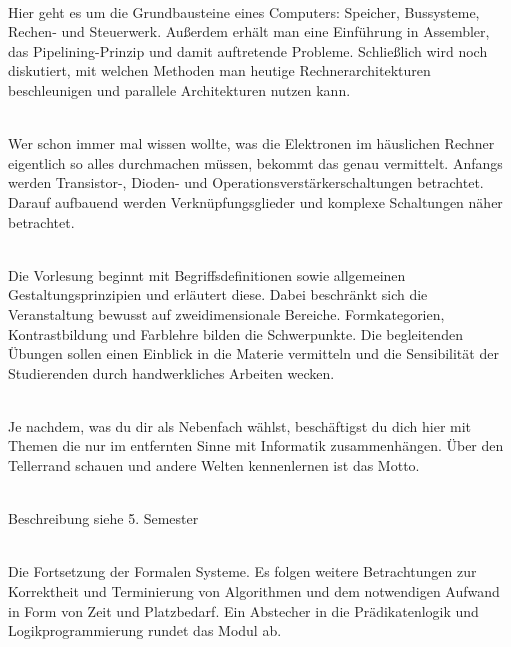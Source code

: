 \textbf{} \\
Hier geht es um die Grundbausteine eines Computers:
Speicher, Bussysteme, Rechen- und Steuerwerk.
Außerdem erhält man eine Einführung in Assembler, das Pipelining-Prinzip und damit auftretende Probleme.
Schließlich wird noch diskutiert, mit welchen Methoden man heutige Rechnerarchitekturen beschleunigen und parallele Architekturen nutzen kann.

\textbf{} \\
Wer schon immer mal wissen wollte, was die Elektronen im häuslichen Rechner eigentlich so alles durchmachen müssen, bekommt das genau vermittelt.
Anfangs werden Transistor-, Dioden- und Operationsverstärkerschaltungen betrachtet.
Darauf aufbauend werden Verknüpfungsglieder und komplexe Schaltungen näher betrachtet.

\textbf{} \\
Die Vorlesung beginnt mit Begriffsdefinitionen sowie allgemeinen Gestaltungsprinzipien und erläutert diese.
Dabei beschränkt sich die Veranstaltung bewusst auf zweidimensionale Bereiche.
Formkategorien, Kontrastbildung und Farblehre bilden die Schwerpunkte.
Die begleitenden Übungen sollen einen Einblick in die Materie vermitteln und die Sensibilität der Studierenden durch handwerkliches Arbeiten wecken.

\textbf{} \\
Je nachdem, was du dir als Nebenfach wählst, beschäftigst du dich hier mit Themen die nur im entfernten Sinne mit Informatik zusammenhängen.
Über den Tellerrand schauen und andere Welten kennenlernen ist das Motto.

\textbf{} \\
Beschreibung siehe 5. Semester


\newpage


\textbf{} \\
Die Fortsetzung der Formalen Systeme.
Es folgen weitere Betrachtungen zur Korrektheit und Terminierung von Algorithmen und dem notwendigen Aufwand in Form von Zeit und Platzbedarf.
Ein Abstecher in die Prädikatenlogik und Logikprogrammierung rundet das Modul ab.

